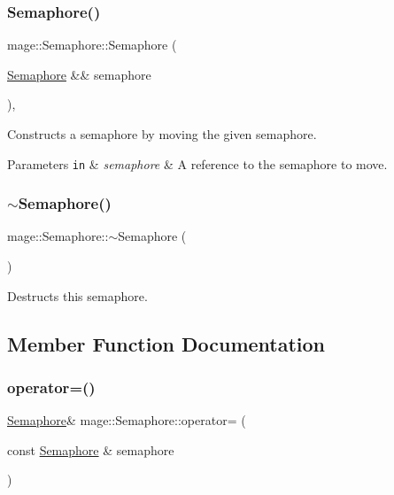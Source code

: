 \subsubsection{\texorpdfstring{Semaphore()}{Semaphore()}\hspace{0.1cm}{\footnotesize\ttfamily [3/3]}}
{\footnotesize\ttfamily mage\+::\+Semaphore\+::\+Semaphore (\begin{DoxyParamCaption}\item[{\hyperlink{classmage_1_1_semaphore}{Semaphore} \&\&}]{semaphore }\end{DoxyParamCaption})\hspace{0.3cm}{\ttfamily [default]}, {\ttfamily [noexcept]}}

Constructs a semaphore by moving the given semaphore.


\begin{DoxyParams}[1]{Parameters}
\mbox{\tt in}  & {\em semaphore} & A reference to the semaphore to move. \\
\hline
\end{DoxyParams}
\hypertarget{classmage_1_1_semaphore_a991ed365c28e4a9c63ff34a5efeb012d}{}\label{classmage_1_1_semaphore_a991ed365c28e4a9c63ff34a5efeb012d} 
\subsubsection{\texorpdfstring{$\sim$\+Semaphore()}{~Semaphore()}}
{\footnotesize\ttfamily mage\+::\+Semaphore\+::$\sim$\+Semaphore (\begin{DoxyParamCaption}{ }\end{DoxyParamCaption})}

Destructs this semaphore. 

\subsection{Member Function Documentation}
\hypertarget{classmage_1_1_semaphore_af3308cf7fa1ed33cda0ee53b9565f658}{}\label{classmage_1_1_semaphore_af3308cf7fa1ed33cda0ee53b9565f658} 
\subsubsection{\texorpdfstring{operator=()}{operator=()}\hspace{0.1cm}{\footnotesize\ttfamily [1/2]}}
{\footnotesize\ttfamily \hyperlink{classmage_1_1_semaphore}{Semaphore}\& mage\+::\+Semaphore\+::operator= (\begin{DoxyParamCaption}\item[{const \hyperlink{classmage_1_1_semaphore}{Semaphore} \&}]{semaphore }\end{DoxyParamCaption})\hspace{0.3cm}{\ttfamily [delete]}}

